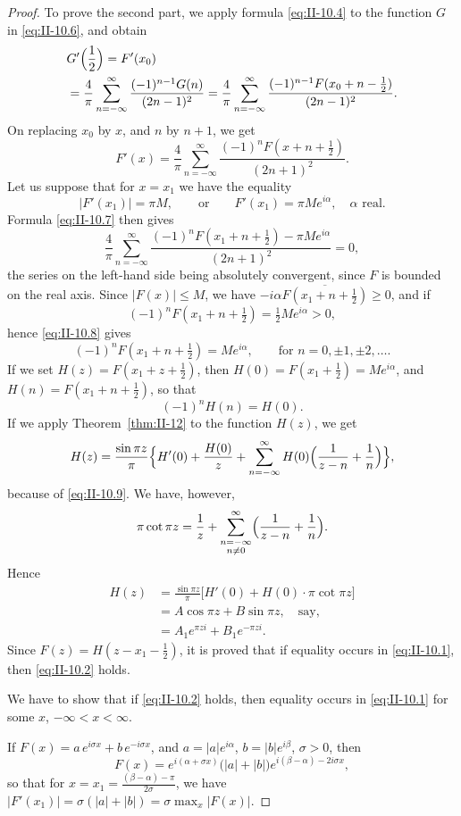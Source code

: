 \begin{proof}
To prove the second part, we apply formula \eqref{eq:II-10.4} to the function $G$ in \eqref{eq:II-10.6}, and obtain
\[
\begin{aligned}
&G'  \Bigl(\frac{1}{2}\Bigr) = F'(x_{0})\\
&= \frac{4}{\pi}\sum_{n=-\infty}^{\infty}\frac{(-1)^{n-1}G(n)}{(2n-1)^{2}} = \frac{4}{\pi}\sum_{n=-\infty}^{\infty}\frac{(-1)^{n-1}F(x_{0}+n-\frac{1}{2})}{(2n-1)^{2}}.
\end{aligned}
\]
On replacing $x_{0}$ by $x$, and $n$ by $n+1$, we get
\begin{equation}\tag{10.7}\label{eq:II-10.7}
F'(x)=\frac{4}{\pi}\sum_{n=-\infty}^{\infty}\frac{(-1)^{n}F(x+n+\frac{1}{2})}{(2n+1)^{2}}.
\end{equation}
Let us suppose that for $x=x_{1}$ we have the equality
\[
|F'(x_{1})|=\pi M,\qquad\text{or}\qquad F'(x_{1})=\pi M e^{i\alpha},\quad\alpha\text{ real}.
\]
Formula \eqref{eq:II-10.7} then gives
\begin{equation}\tag{10.8}\label{eq:II-10.8}
\frac{4}{\pi}\sum_{n=-\infty}^{\infty}\frac{(-1)^{n}F(x_{1}+n+\frac{1}{2})-\pi M e^{i\alpha}}{(2n+1)^{2}}=0,
\end{equation}
the series on the left-hand side being absolutely convergent, since $F$ is bounded on the real axis. Since $|F(x)|\le M$, we have $-i\alpha\overline{F(x_{1}+n+\frac{1}{2})}\ge 0$, and if
\[
(-1)^{n}F(x_{1}+n+\tfrac{1}{2})=\tfrac{1}{2}M e^{i\alpha}>0,
\]
hence \eqref{eq:II-10.8} gives
\[
(-1)^{n}F(x_{1}+n+\tfrac{1}{2})=M e^{i\alpha},\qquad\text{for }n=0,\pm1,\pm2,\dots.
\]
If we set $H(z)=F(x_{1}+z+\frac{1}{2})$, then $H(0)=F(x_{1}+\frac{1}{2})=M e^{i\alpha}$, and $H(n)=F(x_{1}+n+\frac{1}{2})$, so that
\begin{equation}\tag{10.9}\label{eq:II-10.9}
(-1)^{n}H(n)=H(0).
\end{equation}
If we apply Theorem~\ref{thm:II-12} to the function $H(z)$, we get
\[
H(z)=\frac{\sin\pi z}{\pi}\Bigl\{H'(0)+\frac{H(0)}{z}
+\sum_{n=-\infty}^{\infty}H(0)\Bigl(\frac{1}{z-n}+\frac{1}{n}\Bigr)\Bigr\},
\]
because of \eqref{eq:II-10.9}. We have, however,
\[
\pi\cot\pi z=\frac{1}{z}+\sum_{\substack{n=-\infty\\ n\neq 0}}^{\infty}\Bigl(\frac{1}{z-n}+\frac{1}{n}\Bigr).
\]
Hence
\[
\begin{aligned}
H(z) &= \frac{\sin\pi z}{\pi}\bigl[H'(0)+H(0)\cdot\pi\cot\pi z\bigr]\\
&= A\cos\pi z+B\sin\pi z,\quad\text{say},\\
&= A_{1}e^{\pi z i}+B_{1}e^{-\pi z i}.
\end{aligned}
\]
Since $F(z)=H(z-x_{1}-\frac{1}{2})$, it is proved that if equality occurs in \eqref{eq:II-10.1}, then \eqref{eq:II-10.2} holds.

We have to show that if \eqref{eq:II-10.2} holds, then equality occurs in \eqref{eq:II-10.1} for some $x$, $-\infty<x<\infty$.

If $F(x)=a\,e^{i\sigma x}+b\,e^{-i\sigma x}$, and $a=|a|e^{i\alpha}$, $b=|b|e^{i\beta}$, $\sigma>0$, then
\[
F(x)=e^{i(\alpha+\sigma x)}\bigl(|a|+|b|\bigr)e^{i(\beta-\alpha)-2i\sigma x},
\]
so that for $x=x_{1}=\frac{(\beta-\alpha)-\pi}{2\sigma}$, we have $|F'(x_{1})|=\sigma(|a|+|b|)=\sigma\max_{x}|F(x)|$.
\end{proof}

